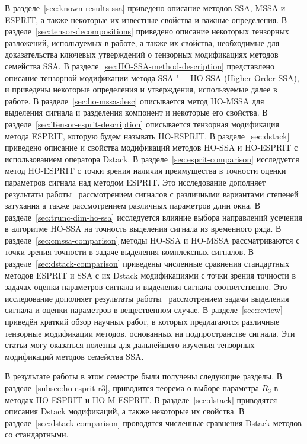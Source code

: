 \documentclass[specialist,
  substylefile=spbu_report.rtx,
subf,href,colorlinks=true, 12pt]{disser}
\theoremstyle{plain}
\theoremstyle{definition}
\theoremstyle{remark}
\begin{document}
В разделе~\ref{sec:known-results-ssa} приведено описание методов
SSA, MSSA и ESPRIT, а также некоторые их
известные свойства и важные определения.
В разделе~\ref{sec:tensor-decompositions} приведено описание
некоторых тензорных разложений, используемых в работе,
а также их свойства, необходимые для доказательства ключевых утверждений о
тензорных модификациях методов семейства SSA.
В разделе~\ref{sec:HO-SSA-method-description}
представлено описание тензорной модификации метода SSA "--- HO-SSA
(Higher-Order SSA), и приведены некоторые определения и утверждения,
используемые далее в работе.
В разделе~\ref{sec:ho-mssa-desc}
описывается метод HO-MSSA для выделения сигнала и разделения
компонент и некоторые его свойства.
В разделе~\ref{sec:Tensor-esprit-description} описывается
тензорная модификация метода ESPRIT, которую будем называть
HO-ESPRIT.
В разделе~\ref{sec:dstack} приведено описание и свойства модификаций методов
HO-SSA и HO-ESPRIT с использованием оператора Dstack.
В разделе~\ref{sec:esprit-comparison} исследуется метод
HO-ESPRIT с точки зрения наличия преимущества в точности
оценки параметров сигнала над методом ESPRIT.
Это исследование дополняет результаты работы~\cite{hosvd-hooi-separation}
рассмотрением сигналов с различными вариантами степеней затухания
а также рассмотрением различных параметров длин окна.
В разделе~\ref{sec:trunc-dim-ho-ssa} исследуется влияние
выбора направлений усечения в алгоритме HO-SSA на точность
выделения сигнала из временного ряда.
В разделе~\ref{sec:cmssa-comparison} методы HO-SSA и HO-MSSA
рассматриваются с точки зрения точности в задаче выделения
комплексных сигналов.
В разделе~\ref{sec:dstack-comparison} приведены численные сравнения
стандартных методов ESPRIT и SSA с их Dstack модификациями с точки
зрения точности в задачах оценки параметров сигнала и выделения
сигнала соответственно.
Это исследование дополняет результаты работы~\cite{Papy2009}
рассмотрением задачи выделения сигнала и оценки параметров в
вещественном случае.
В разделе~\ref{sec:review} приведён краткий обзор научных работ, в
которых предлагаются различные тензорные модификации методов,
основанных на подпространстве сигнала. Эти статьи могу оказаться
полезны для дальнейшего изучения тензорных модификаций методов семейства SSA.

В результате работы в этом семестре были получены следующие разделы.
В разделе~\ref{subsec:ho-esprit-r3}, приводится теорема о
выборе параметра $R_3$ в методах HO-ESPRIT и HO-M-ESPRIT.
В разделе~\ref{sec:dstack} приводятся описания Dstack модификаций, а
также некоторые их свойства.
В разделе~\ref{sec:dstack-comparison} проводятся численные сравнения
Dstack методов со стандартными.
\end{document}

